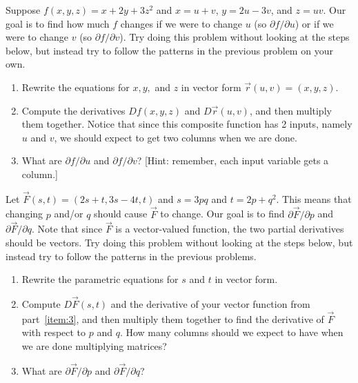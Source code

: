 \begin{problem}
%
 Suppose $f(x,y,z) = x+2y+3z^2$ and $x=u+v$, $y=2u-3v$, and $z=uv$. Our goal is to find how much $f$ changes if we were to change $u$ (so $\partial f/\partial u$) or if we were to change $v$ (so $\partial f/\partial v$). Try doing this problem without looking at the steps below, but instead try to follow the patterns in the previous problem on your own. 
 \begin{enumerate}
  \item Rewrite the equations for $x,y,$ and $z$ in vector form $\vec r(u,v)=(x,y,z)$. %
  \item Compute the derivatives $Df(x,y,z)$ and $D\vec r(u,v)$, and then multiply them together. Notice that since this composite function has 2 inputs, namely $u$ and $v$, we should expect to get two columns when we are done.
  \item What are $\partial f/\partial u$ and $\partial f/\partial v$? [Hint: remember, each input variable gets a column.]
 \end{enumerate}
\end{problem}


\begin{problem}
 Let $\vec F(s,t) = (2s+t,3s-4t,t)$ and $s=3pq$ and $t=2p+q^2$.  This means that changing $p$ and/or $q$ should cause $\vec F$ to change. Our goal is to find $\partial \vec F/\partial p$ and $\partial \vec F/\partial q$. Note that since $\vec F$ is a vector-valued function, the two partial derivatives should be vectors. Try doing this problem without looking at the steps below, but instead try to follow the patterns in the previous problems. 
 \begin{enumerate}
  \item\label{item:3} Rewrite the parametric equations for $s$ and $t$ in vector form.
  \item Compute $D\vec F(s,t)$ and the derivative of your vector function from part~\ref{item:3}, and then multiply them together to find the derivative of $\vec F$ with respect to $p$ and $q$.  How many columns should we expect to have when we are done multiplying matrices?
  \item What are $\partial \vec F/\partial p$ and $\partial \vec F/\partial q$? 
 \end{enumerate}
\end{problem}

